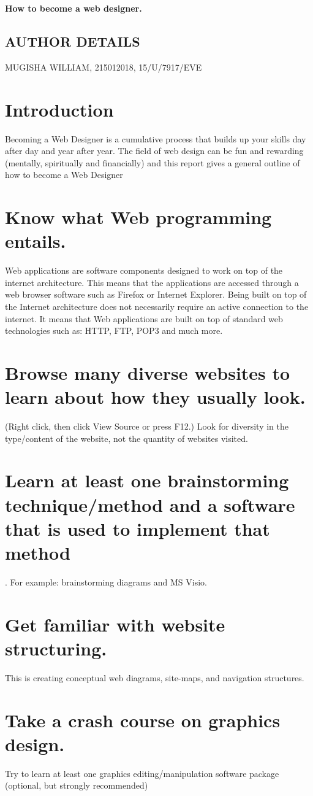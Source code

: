 \documentclass[options]{article}
\begin{document}
{\textbf{How to become a web designer.}}

\subsection{\textbf{AUTHOR DETAILS}}
 MUGISHA WILLIAM, 215012018, 15/U/7917/EVE

\section{\textbf{Introduction}}
Becoming a Web Designer is a cumulative process that builds up your skills day after day and year after year. The field of web design can be fun and rewarding (mentally, spiritually and financially) and this report gives a general outline of how to become a Web Designer
\section{\textbf{Know what Web programming entails. }}
Web applications are software components designed to work on top of the internet architecture. This means that the applications are accessed through a web browser software such as Firefox or Internet Explorer. Being built on top of the Internet architecture does not necessarily require an active connection to the internet. It means that Web applications are built on top of standard web technologies such as: HTTP, FTP, POP3 and much more.
\section{\textbf{Browse many diverse websites to learn about how they usually look. }}
(Right click, then click View Source or press F12.) Look for diversity in the type/content of the website, not the quantity of websites visited.
\section{\textbf{Learn at least one brainstorming technique/method and a software that is used to implement that method}}. For example: brainstorming diagrams and MS Visio.
\section{\textbf{Get familiar with website structuring. }}
This is creating conceptual web diagrams, site-maps, and navigation structures.  
\section{\textbf{Take a crash course on graphics design. }}
Try to learn at least one graphics editing/manipulation software package (optional, but strongly recommended)
\end{document}
